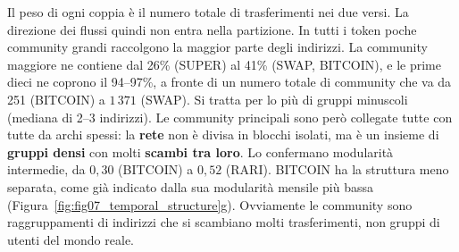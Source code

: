 \documentclass[11pt]{article}
\begin{document}
Il peso di ogni coppia è il numero totale di trasferimenti nei due versi.
La direzione dei flussi quindi non entra nella partizione.
In tutti i token poche community grandi raccolgono la maggior parte degli
indirizzi. La community maggiore ne contiene dal 26\% (SUPER) al 41\% (SWAP,
BITCOIN), e le prime dieci ne coprono il 94--97\%, a fronte di un numero
totale di community che va da 251 (BITCOIN) a $1\,371$ (SWAP). Si tratta per
lo più di gruppi minuscoli (mediana di 2--3 indirizzi). Le community
principali sono però collegate tutte con tutte da archi spessi: la \textbf{rete} non è
divisa in blocchi isolati, ma è un insieme di \textbf{gruppi densi} con molti \textbf{scambi
tra loro}. Lo confermano modularità intermedie, da $0{,}30$ (BITCOIN) a
$0{,}52$ (RARI). BITCOIN ha la struttura meno separata, come già indicato
dalla sua modularità mensile più bassa (Figura~\ref{fig:fig07_temporal_structure}g).
Ovviamente le community sono raggruppamenti di indirizzi che si scambiano
molti trasferimenti, non gruppi di utenti del mondo reale.
\end{document}

